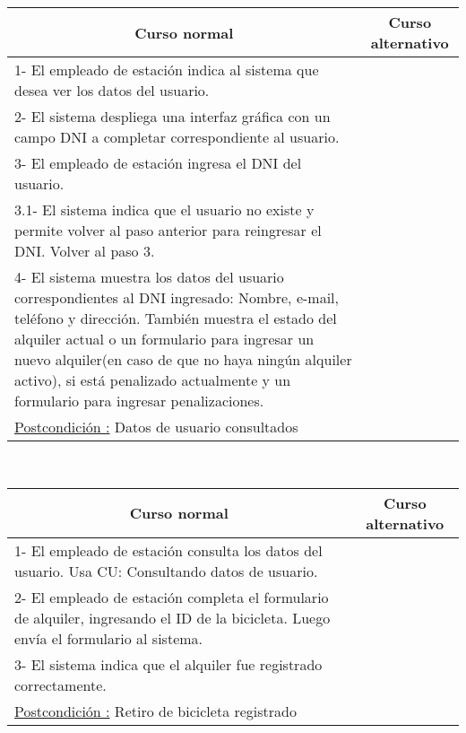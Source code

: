 \begin{center}
    \centering
    \begin{tabular}{ | p{11cm} | p{6cm} | }
    	\multicolumn{1}{c}{\cellcolor{black!30}\textbf{Curso normal}} & 
    	\multicolumn{1}{c}{\cellcolor{black!30}\textbf{Curso alternativo}} \\
		\hline
		1- El empleado de estación indica al sistema que desea ver los datos del usuario. &  \\ \hline
		2- El sistema despliega una interfaz gráfica con un campo DNI a completar correspondiente al usuario. &  \\ \hline
		3- El empleado de estación ingresa el DNI del usuario. & \\ \hline  
		3.1- El sistema indica que el usuario no existe y permite volver al paso anterior para reingresar el DNI. Volver al paso 3. \\ \hline
		4- El sistema muestra los datos del usuario correspondientes al DNI ingresado: Nombre, e-mail, teléfono y dirección. También muestra el estado del alquiler actual o un formulario para ingresar un nuevo alquiler(en caso de que no haya ningún alquiler activo), si está penalizado actualmente y un formulario para ingresar penalizaciones. & \\ \hline		
		\underline{Postcondición :} Datos de usuario consultados & \\ \hline
    \end{tabular}
\end{center}

~

\begin{center}
    \centering
    \begin{tabular}{ | p{11cm} | p{6cm} | }
    	\multicolumn{1}{c}{\cellcolor{black!30}\textbf{Curso normal}} & 
    	\multicolumn{1}{c}{\cellcolor{black!30}\textbf{Curso alternativo}} \\
		\hline
		1- El empleado de estación consulta los datos del usuario. Usa CU: Consultando datos de usuario. &  \\ \hline
		2- El empleado de estación completa el formulario de alquiler, ingresando el ID de la bicicleta. Luego envía el formulario al sistema. & \\ \hline
		3- El sistema indica que el alquiler fue registrado correctamente. & \\ \hline
		\underline{Postcondición :} Retiro de bicicleta registrado & \\ \hline
    \end{tabular}
\end{center}

